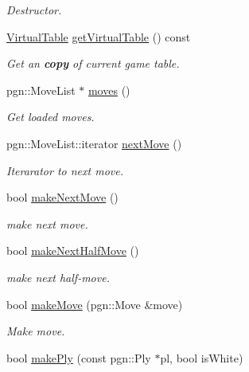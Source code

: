 \begin{DoxyCompactItemize}
\begin{DoxyCompactList}\small\item\em Destructor. \item\end{DoxyCompactList}\item 
\hyperlink{classChEngn_1_1Table}{VirtualTable} \hyperlink{classChEngn_1_1Engine_a26f8db48e99d547fbc41eaa9dca8e6cf}{getVirtualTable} () const 
\begin{DoxyCompactList}\small\item\em Get an {\bfseries copy} of current game table. \item\end{DoxyCompactList}\item 
pgn::MoveList $\ast$ \hyperlink{classChEngn_1_1Engine_aad1f51b4eed22bb6eab999ffb7fa2516}{moves} ()
\begin{DoxyCompactList}\small\item\em Get loaded moves. \item\end{DoxyCompactList}\item 
pgn::MoveList::iterator \hyperlink{classChEngn_1_1Engine_ad35252a7c6a7e84a34d12a688360a75f}{nextMove} ()
\begin{DoxyCompactList}\small\item\em Iterarator to next move. \item\end{DoxyCompactList}\item 
bool \hyperlink{classChEngn_1_1Engine_a16b3f2bb7787bccf321f8a03935947c2}{makeNextMove} ()
\begin{DoxyCompactList}\small\item\em make next move. \item\end{DoxyCompactList}\item 
bool \hyperlink{classChEngn_1_1Engine_ab9f6f3cbf3e7866887b049f61f9ce46b}{makeNextHalfMove} ()
\begin{DoxyCompactList}\small\item\em make next half-\/move. \item\end{DoxyCompactList}\item 
bool \hyperlink{classChEngn_1_1Engine_a3bfc7cfe7e147e4d5d7f645d0cb72c8d}{makeMove} (pgn::Move \&move)
\begin{DoxyCompactList}\small\item\em Make move. \item\end{DoxyCompactList}\item 
bool \hyperlink{classChEngn_1_1Engine_a66f202e6cd42b2eeff43c8d58fe9ce38}{makePly} (const pgn::Ply $\ast$pl, bool isWhite)
\end{DoxyCompactItemize}
